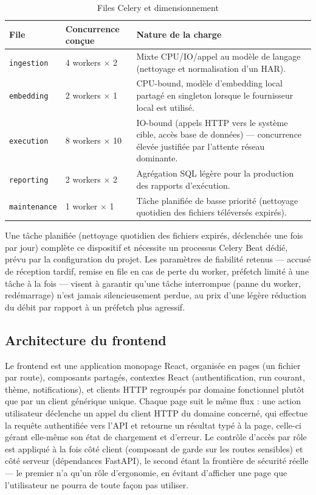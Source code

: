 \begin{table}[H]
  \centering
  \caption{Files Celery et dimensionnement}
  \label{tab:queues-celery}
  \begin{tabularx}{\textwidth}{L{3cm}L{3cm}Y}
    File & Concurrence conçue & Nature de la charge \\
    \hline
    \texttt{ingestion} & 4 workers $\times$ 2 & Mixte CPU/IO/appel au modèle de langage (nettoyage et normalisation d'un HAR). \\
    \hline
    \texttt{embedding} & 2 workers $\times$ 1 & CPU-bound, modèle d'embedding local partagé en singleton lorsque le fournisseur local est utilisé. \\
    \hline
    \texttt{execution} & 8 workers $\times$ 10 & IO-bound (appels HTTP vers le système cible, accès base de données) — concurrence élevée justifiée par l'attente réseau dominante. \\
    \hline
    \texttt{reporting} & 2 workers $\times$ 2 & Agrégation SQL légère pour la production des rapports d'exécution. \\
    \hline
    \texttt{maintenance} & 1 worker $\times$ 1 & Tâche planifiée de basse priorité (nettoyage quotidien des fichiers téléversés expirés). \\
    \hline
  \end{tabularx}
\end{table}

Une tâche planifiée (nettoyage quotidien des fichiers expirés, déclenchée une fois par jour) complète ce dispositif et nécessite un processus Celery Beat dédié, prévu par la configuration du projet. Les paramètres de fiabilité retenus — accusé de réception tardif, remise en file en cas de perte du worker, préfetch limité à une tâche à la fois — visent à garantir qu'une tâche interrompue (panne du worker, redémarrage) n'est jamais silencieusement perdue, au prix d'une légère réduction du débit par rapport à un préfetch plus agressif.

\subsection{Architecture du frontend}

Le frontend est une application monopage React, organisée en pages (un fichier par route), composants partagés, contextes React (authentification, run courant, thème, notifications), et clients HTTP regroupés par domaine fonctionnel plutôt que par un client générique unique. Chaque page suit le même flux : une action utilisateur déclenche un appel du client HTTP du domaine concerné, qui effectue la requête authentifiée vers l'API et retourne un résultat typé à la page, celle-ci gérant elle-même son état de chargement et d'erreur. Le contrôle d'accès par rôle est appliqué à la fois côté client (composant de garde sur les routes sensibles) et côté serveur (dépendances FastAPI), le second étant la frontière de sécurité réelle — le premier n'a qu'un rôle d'ergonomie, en évitant d'afficher une page que l'utilisateur ne pourra de toute façon pas utiliser.

